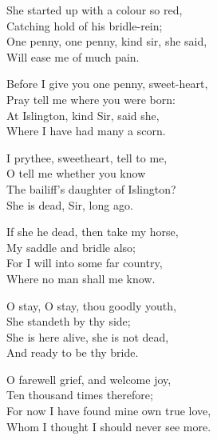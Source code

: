 \settowidth{\versewidth}{\vin For now I have found mine own true love,}
\begin{dcverse}\begin{altverse}
She started up with a colour so red,\\
Catching hold of his bridle-rein;\\
One penny, one penny, kind sir, she said,\\
Will ease me of much pain.
\end{altverse}

\begin{altverse}
Before I give you one penny, sweet-heart,\\
Pray tell me where you were born:\\
At Islington, kind Sir, said she,\\
Where I have had many a scorn.
\end{altverse}

\begin{altverse}
I prythee, sweetheart, tell to me,\\
O tell me whether you know\\
The bailiff’s daughter of Islington?\\
She is dead, Sir, long ago.
\end{altverse}

\begin{altverse}
If she he dead, then take my horse,\\
My saddle and bridle also;\\
For I will into some far country,\\
Where no man shall me know.
\end{altverse}

\begin{altverse}
O stay, O stay, thou goodly youth,\\
She standeth by thy side;\\
She is here alive, she is not dead,\\
And ready to be thy bride.
\end{altverse}

\begin{altverse}
O farewell grief, and welcome joy,\\
Ten thousand times therefore;\\
For now I have found mine own true love,\\
Whom I thought I should never see more.
\end{altverse}
\end{dcverse}

